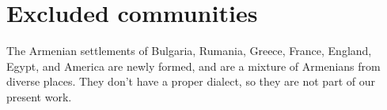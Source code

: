 \section{Excluded communities}\label{sec:Branches:excluded}


The Armenian settlements of Bulgaria, Rumania, Greece, France, England, Egypt, and America are newly formed, and are a mixture of Armenians from diverse places. They don't have a proper dialect, so they are not part of our present work. 


